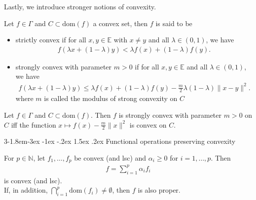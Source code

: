 \documentclass{tufte-handout}
\makeatletter
\renewcommand{\subsection}{\@startsection{subsection}%
    {3}{-1.8em}{-3ex \@plus -1ex \@minus -.2ex}%
    {1.5ex \@plus .2ex}
    {\hspace*{-5.5em}\fcolorbox{ltblue}{ltblue}{\parbox[c][1.0ex][b]{4em}{\phantom{space}}}
    \normalfont\large\itshape\color{ltblue}}}
\makeatother
\begin{document}
Lastly, we introduce stronger notions of convexity.
\begin{Definition}
    Let \( f\in \Gamma \) and \( C \subset \text{dom}(f) \) a convex set, then \( f \) is said to be 
    \begin{itemize}
        \item strictly convex if for all \( x, y \in \mathbb{E} \) with \( x \neq y \) and all \( \lambda \in (0, 1) \), we have
    \begin{align}
        f(\lambda x + (1-\lambda) y) < \lambda f(x) + (1-\lambda) f(y).
    \end{align}
        \item strongly convex with parameter \( m > 0 \) if for all \( x, y \in \mathbb{E} \) and all \( \lambda \in (0, 1) \), we have
    \begin{align}
        f(\lambda x + (1-\lambda) y) \leq \lambda f(x) + (1-\lambda) f(y) - \frac{m}{2} \lambda (1-\lambda) \|x - y\|^2.
    \end{align}
    where \( m \) is called the modulus of strong convexity on \( C \)
    \end{itemize}
\end{Definition}

\begin{Proposition}
    Let \( f \in \Gamma \) and \( C \subset \text{dom}(f) \). Then 
    \( f \) is strongly convex with parameter \( m > 0 \) on \( C \) iff the function \( x \mapsto f(x) - \frac{m}{2} \|x\|^2 \) is convex on \( C \).
\end{Proposition}

\subsection{Functional operations preserving convexity}
\begin{Proposition}
    For \( p \in \mathbb{N} \), let \( f_1, \ldots, f_p \) be convex (and lsc) and 
    \(\alpha_i\geq 0\) for \(i=1,\ldots, p\). 
    Then 
    \begin{align}
    f = \sum_{i=1}^p \alpha_i f_i
    \end{align}
    is convex (and lsc).\\
    If, in addition, \(\bigcap_{i=1}^p \text{dom}(f_i) \neq \emptyset\), then \( f \) is also proper.
\end{Proposition}
\end{document}
